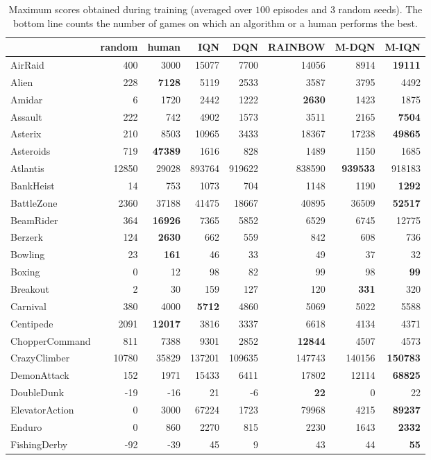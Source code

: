 \documentclass{article}
\begin{document}
\begin{table}
    \caption{Maximum scores obtained during training (averaged over $100$ episodes and  $3$ random seeds). The bottom line counts the number of games on which an algorithm or a human performs the best.} 
    \centering
\tiny
    \begin{tabular}{l r r r r r r r}
\toprule
&random&human&IQN&DQN&RAINBOW&M-DQN&M-IQN\\ 
\midrule
AirRaid&400&3000&15077&7700&14056&8914&\textbf{19111}\\
Alien&228&\textbf{7128}&5119&2533&3587&3795&4492\\
Amidar&6&1720&2442&1222&\textbf{2630}&1423&1875\\
Assault&222&742&4902&1573&3511&2165&\textbf{7504}\\
Asterix&210&8503&10965&3433&18367&17238&\textbf{49865}\\
Asteroids&719&\textbf{47389}&1616&828&1489&1150&1685\\
Atlantis&12850&29028&893764&919622&838590&\textbf{939533}&918183\\
BankHeist&14&753&1073&704&1148&1190&\textbf{1292}\\
BattleZone&2360&37188&41475&18667&40895&36509&\textbf{52517}\\
BeamRider&364&\textbf{16926}&7365&5852&6529&6745&12775\\
Berzerk&124&\textbf{2630}&662&559&842&608&736\\
Bowling&23&\textbf{161}&46&33&49&37&32\\
Boxing&0&12&98&82&99&98&\textbf{99}\\
Breakout&2&30&159&127&120&\textbf{331}&320\\
Carnival&380&4000&\textbf{5712}&4860&5069&5022&5588\\
Centipede&2091&\textbf{12017}&3816&3337&6618&4134&4371\\
ChopperCommand&811&7388&9301&2852&\textbf{12844}&4507&4573\\
CrazyClimber&10780&35829&137201&109635&147743&140156&\textbf{150783}\\
DemonAttack&152&1971&15433&6411&17802&12114&\textbf{68825}\\
DoubleDunk&-19&-16&21&-6&\textbf{22}&0&22\\
ElevatorAction&0&3000&67224&1723&79968&4215&\textbf{89237}\\
Enduro&0&860&2270&815&2230&1643&\textbf{2332}\\
FishingDerby&-92&-39&45&9&43&44&\textbf{55}\\

\end{tabular}
\end{table}
\end{document}
